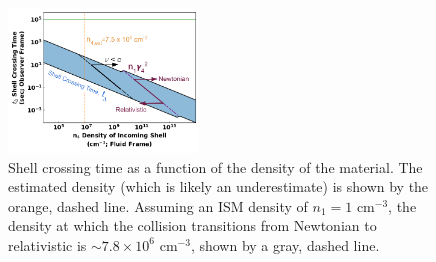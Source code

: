 \documentclass[linenumbers,twocolumn]{aastex631}
\begin{document}
{    \begin{figure}[t!]
        \centering
        \includegraphics[width=0.45\textwidth]{shell-cross-time.png}
        \caption{Shell crossing time as a function of the density of the material. The estimated density (which is likely an underestimate) is shown by the orange, dashed line. Assuming an ISM density of $n_1 = 1$ cm$^{-3}$, the density at which the collision transitions from Newtonian to relativistic is $\sim 7.8\times10^6$ cm$^{-3}$, shown by a gray, dashed line.}
        \label{fig: plot}
    \end{figure}
}
\end{document}

